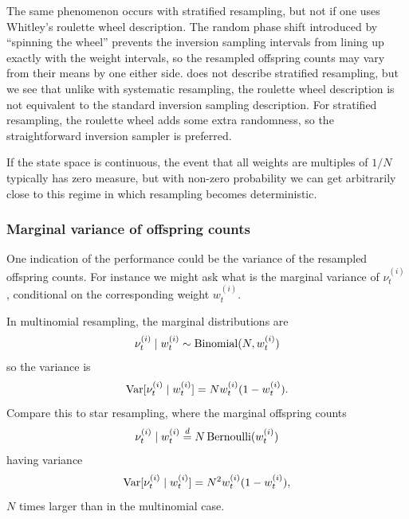 The same phenomenon occurs with stratified resampling, but not if one uses Whitley's roulette wheel description. The random phase shift introduced by ``spinning the wheel'' prevents the inversion sampling intervals from lining up exactly with the weight intervals, so the resampled offspring counts may vary from their means by one either side.
\textcite{whitley1994} does not describe stratified resampling, but we see that unlike with systematic resampling, the roulette wheel description is not equivalent to the standard inversion sampling description. 
For stratified resampling, the roulette wheel adds some extra randomness, so the straightforward inversion sampler is preferred.

If the state space is continuous, the event that all weights are multiples of $1/N$ typically has zero measure, but with non-zero probability we can get arbitrarily close to this regime in which resampling becomes deterministic.




\subsubsection{Marginal variance of offspring counts \seb{$\checkmark$} }

One indication of the performance could be the variance of the resampled offspring counts. For instance we might ask what is the marginal variance of $\nu_t^{(i)}$, conditional on the corresponding weight $w_t^{(i)}$.

In multinomial resampling, the marginal distributions are
\begin{equation*}
\nu_t^{(i)} \mid w_t^{(i)} 
\sim \operatorname{Binomial}(N, w_t^{(i)})
\end{equation*}
so the variance is
\begin{equation*}
\operatorname{Var}[ \nu_t^{(i)} \mid w_t^{(i)} ]
= N w_t^{(i)} ( 1- w_t^{(i)} ) .
\end{equation*}
Compare this to star resampling, where the marginal offspring counts
\begin{equation*}
\nu_t^{(i)} \mid w_t^{(i)} 
\overset{d}{=} N \operatorname{Bernoulli}( w_t^{(i)} )
\end{equation*}
having variance
\begin{equation*}
\operatorname{Var}[ \nu_t^{(i)} \mid w_t^{(i)} ]
= N^2 w_t^{(i)} ( 1- w_t^{(i)} ) ,
\end{equation*}
$N$ times larger than in the multinomial case.


